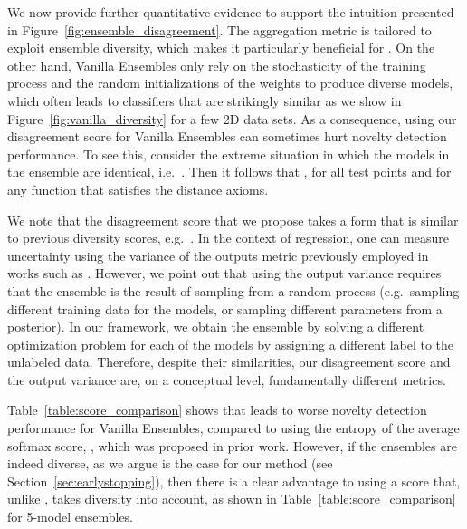 We now provide further quantitative evidence to support the intuition presented
in Figure~\ref{fig:ensemble_disagreement}.  The aggregation metric is tailored
to exploit ensemble diversity, which makes it particularly beneficial for
.  On the other hand, Vanilla Ensembles only rely on the stochasticity
of the training process and the random initializations of the weights to produce
diverse models, which often leads to classifiers that are strikingly similar as
we show in Figure~\ref{fig:vanilla_diversity} for a few 2D data sets. As a
consequence, using our disagreement score  for Vanilla Ensembles can
sometimes hurt novelty detection performance. To see this, consider the extreme
situation in which the models in the ensemble are identical, i.e.\ .
Then it follows that , for all test points  and
for any function  that satisfies the distance axioms.  

We note that the disagreement score that we propose takes a form that is similar
to previous diversity scores, e.g.\ \citet{Zhang2010, mcd_ood}. In the context
of regression, one can measure uncertainty using the variance of the outputs
metric previously employed in works such as \citet{gal2016}. However, we point
out that using the output variance requires that the ensemble is the result of
sampling from a random process (e.g.\ sampling different training data for the
models, or sampling different parameters from a posterior). In our framework, we
obtain the ensemble by solving a different optimization problem for each of the
models by assigning a different label to the unlabeled data.  Therefore, despite
their similarities, our disagreement score and the output variance are, on a
conceptual level, fundamentally different metrics.

Table~\ref{table:score_comparison} shows that  leads to worse novelty 
detection performance for Vanilla Ensembles, compared to using the entropy of
the average softmax score, , which was proposed in prior work.
However, if the ensembles are indeed diverse, as we argue is the case for our
method  (see Section~\ref{sec:earlystopping}), then there is a clear
advantage to using a score that, unlike , takes diversity into account,
as shown in Table~\ref{table:score_comparison} for 5-model  ensembles. 



